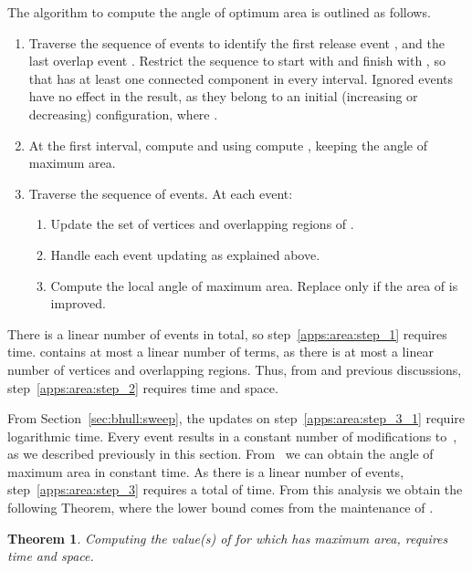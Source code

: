 \documentclass[11pt,letterpaper,english]{article}
\newtheorem{theorem}{Theorem}
\theoremstyle{definition}
\begin{document}
The algorithm to compute the angle of optimum area is outlined as
follows.
\begin{enumerate}
\item \label{apps:area:step_1}Traverse the sequence of events to
  identify the first release event , and the last
  overlap event .
  Restrict the sequence to start with  and finish with , so that  has at least one connected component in every interval. Ignored events have no effect in the
  result, as they belong to an initial (increasing or decreasing) configuration, where .
\item \label{apps:area:step_2} At the first interval, compute
 and using  compute
, keeping the angle
 of maximum area.
\item \label{apps:area:step_3}Traverse the sequence of events. At each
  event:
  \begin{enumerate}
  \item \label{apps:area:step_3_1}Update the set of vertices and
    overlapping regions of .
  \item \label{apps:area:step_3_2}Handle each event updating
     as explained above.
  \item \label{apps:area:step_3_3}Compute the local angle of maximum
    area. Replace  only if the area of  is improved.
  \end{enumerate}
\end{enumerate}

There is a linear number of events in total, so
step~\ref{apps:area:step_1} requires 
time.  contains at most a linear number of terms, as
there is at most a linear number of vertices and overlapping
regions. Thus, from  and previous
discussions, step~\ref{apps:area:step_2} requires  time
and  space.

From Section~\ref{sec:bhull:sweep}, the updates on step~\ref{apps:area:step_3_1}
require logarithmic time. Every event results in a constant number of modifications
to~, as we described previously in this
section. From~ we can obtain the angle of
maximum area in constant time. As there is a linear number of events,
step~\ref{apps:area:step_3} requires a total of  time. From
this analysis we obtain the following Theorem, where the lower bound comes
from the maintenance of .

\begin{theorem}
  Computing the value(s) of  for which 
  has maximum area, requires  time and  space.
\end{theorem}
\end{document}
